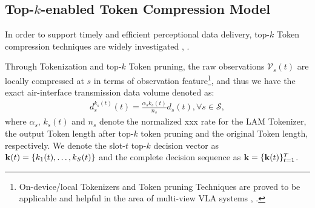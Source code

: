 \documentclass[lettersize,journal]{IEEEtran}
\theoremstyle{custom}
\begin{document}

\subsection{Top-$k$-enabled Token Compression Model}
In order to support timely and efficient perceptional data delivery, top-$k$ Token compression techniques are widely investigated \cite{}, \cite{}. 

Through Tokenization and top-$k$ Token pruning, the raw observations $\mathcal{V}_s(t)$ are locally compressed at $s$ in terms of observation feature\footnote{On-device/local Tokenizers and Token pruning Techniques are proved to be applicable and helpful in the area of multi-view VLA systems \cite{}, \cite{}. }, and thus we have the exact air-interface transmission data volume denoted as: 
\begin{align}
    d_s^{k_s(t)}(t) = \frac{\alpha_s k_s(t)}{n_s} d_s(t), \forall s \in \mathcal{S}, 
\end{align}
where $\alpha_s$, $k_s(t)$ and $n_s$ denote the normalized xxx rate for the LAM Tokenizer, the output Token length after top-$k$ token pruning and the original Token length, respectively. We denote the slot-$t$ top-$k$ decision vector as ${\bf k}(t)=\{k_1(t),\ldots,k_S(t)\}$ and the complete decision sequence as ${\bf k}=\{{\bf k}(t)\}_{t=1}^{T}$.
\end{document}
